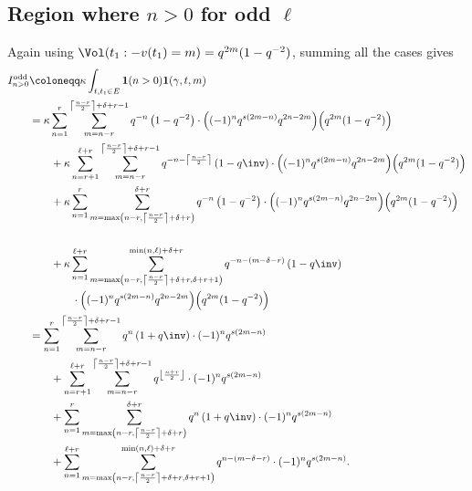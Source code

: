 \subsection{Region where $n > 0$ for odd $\ell$}
Again using $\Vol(t_1:-v(t_1)=m) = q^{2m} (1-q^{-2})$,
summing all the cases gives
\begin{align*}
  I_{n > 0}^{\text{odd}} &\coloneqq
    \kappa \int_{t, t_1 \in E} \mathbf{1}(n > 0) \mathbf{1}(\gamma,t,m) \\
  &= \kappa \sum_{n=1}^{r}
    \sum_{m=n-r}^{\left\lceil \frac{n-r}{2} \right\rceil+\delta+r-1}
    q^{-n} \left( 1 - q^{-2} \right)
      \cdot \Big( (-1)^n q^{s(2m-n)} q^{2n-2m} \Big) \Big( q^{2m}(1-q^{-2}) \Big) \\
  &\qquad+ \kappa \sum_{n=r+1}^{\ell+r}
    \sum_{m=n-r}^{\left\lceil \frac{n-r}{2} \right\rceil+\delta+r-1}
    q^{-n - \left\lceil \frac{n-r}{2} \right\rceil} \left( 1 - q\inv \right)
      \cdot \Big( (-1)^n q^{s(2m-n)} q^{2n-2m} \Big) \Big( q^{2m}(1-q^{-2}) \Big) \\
  &\qquad+ \kappa \sum_{n=1}^{r}
    \sum_{m=\max\left(n-r, \left\lceil \frac{n-r}{2} \right\rceil+\delta+r\right)}^{\delta+r}
    q^{-n} \left( 1 - q^{-2} \right)
      \cdot \Big( (-1)^n q^{s(2m-n)} q^{2n-2m} \Big) \Big( q^{2m}(1-q^{-2}) \Big) \\
    \\
  &\qquad+ \kappa \sum_{n=1}^{\ell+r}
    \sum_{m=\max\left(n-r, \left\lceil \frac{n-r}{2} \right\rceil+\delta+r, \delta+r+1 \right)}^{\min(n,\ell)+\delta+r}
    q^{-n - (m-\delta-r)} \left( 1 - q\inv \right)
      \\ &\qquad\qquad
      \cdot \Big( (-1)^n q^{s(2m-n)} q^{2n-2m} \Big) \Big( q^{2m}(1-q^{-2}) \Big) \\
  &= \sum_{n=1}^{r}
    \sum_{m=n-r}^{\left\lceil \frac{n-r}{2} \right\rceil+\delta+r-1}
    q^{n} \left( 1 + q\inv \right)
      \cdot (-1)^n q^{s(2m-n)} \\
  &\qquad+ \sum_{n=r+1}^{\ell+r}
    \sum_{m=n-r}^{\left\lceil \frac{n-r}{2} \right\rceil+\delta+r-1}
    q^{\left\lfloor \frac{n+r}{2} \right\rfloor}
      \cdot (-1)^n q^{s(2m-n)} \\
  &\qquad+ \sum_{n=1}^{r}
    \sum_{m=\max\left(n-r, \left\lceil \frac{n-r}{2} \right\rceil+\delta+r\right)}^{\delta+r}
    q^{n} \left( 1 + q\inv \right)
      \cdot (-1)^n q^{s(2m-n)} \\
  &\qquad+ \sum_{n=1}^{\ell+r}
    \sum_{m=\max\left(n-r, \left\lceil \frac{n-r}{2} \right\rceil+\delta+r, \delta+r+1 \right)}^{\min(n,\ell)+\delta+r}
    q^{n - (m-\delta-r)}
      \cdot (-1)^n q^{s(2m-n)}.
\end{align*}
